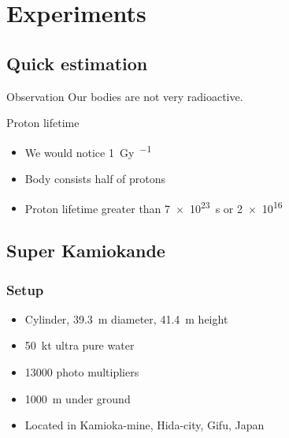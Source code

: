\documentclass[english, fleqn]{beamer}
\begin{document}
\section{Experiments}

\subsection{Quick estimation}

\begin{frame}
    \begin{block}{Observation}
        Our bodies are not very radioactive.
    \end{block}

    \pause

    \begin{block}{Proton lifetime}
        \begin{itemize}
            \item We would notice \SI{1}{\gray\per\year}
            \item Body consists half of protons
            \item Proton lifetime greater than \SI{7e23}{\second} or \SI{2e16}{\year}
        \end{itemize}
    \end{block}

    \nocite{wikipedia/groessenordnung-aequivalentdosis}
\end{frame}

\subsection{Super Kamiokande}

\begin{frame}
    \frametitle{Setup}

    \begin{itemize}
        \item Cylinder, \SI{39.3}{\meter} diameter, \SI{41.4}{\meter} height
        \item \SI{50}{\kilo\tonne} ultra pure water
        \item \num{13000} photo multipliers
        \item \SI{1000}{\meter} under ground
        \item Located in Kamioka-mine, Hida-city, Gifu, Japan
    \end{itemize}

\end{frame}
\end{document}
